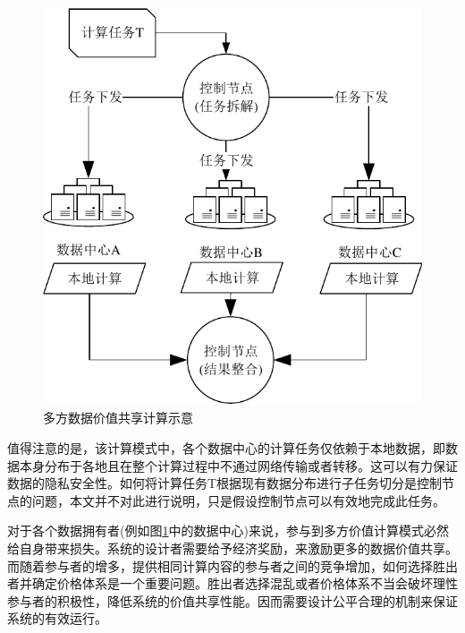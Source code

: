 \documentclass[promaster]{thesis-uestc}
\begin{document}
\begin{figure}[h]
\includegraphics{pic/yuanweishiyi.pdf}
\caption{多方数据价值共享计算示意}
\label{yuanweishiyi}
\end{figure}

值得注意的是，该计算模式中，各个数据中心的计算任务仅依赖于本地数据，即数据本身分布于各地且在整个计算过程中不通过网络传输或者转移。这可以有力保证数据的隐私安全性。如何将计算任务T根据现有数据分布进行子任务切分是控制节点的问题，本文并不对此进行说明，只是假设控制节点可以有效地完成此任务。

对于各个数据拥有者(例如图\ref{yuanweishiyi}中的数据中心)来说，参与到多方价值计算模式必然给自身带来损失。系统的设计者需要给予经济奖励，来激励更多的数据价值共享。而随着参与者的增多，提供相同计算内容的参与者之间的竞争增加，如何选择胜出者并确定价格体系是一个重要问题。胜出者选择混乱或者价格体系不当会破坏理性参与者的积极性，降低系统的价值共享性能。因而需要设计公平合理的机制来保证系统的有效运行。
\end{document}
